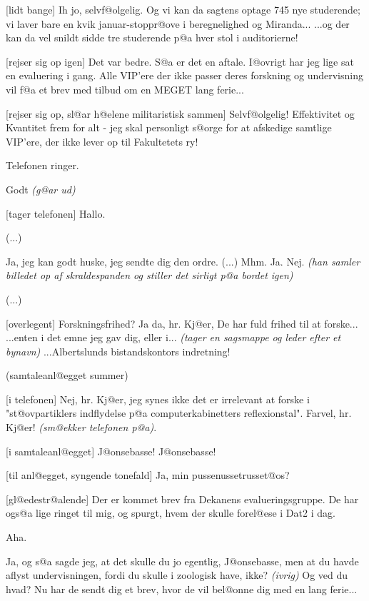 \documentclass[a4paper,11pt]{article}
\begin{document}
\begin{sketch}
[lidt bange] Ih jo, selvf@olgelig. Og vi kan da
sagtens optage 745 nye studerende; vi laver bare en kvik
januar-stoppr@ove i beregnelighed og Miranda... ...og der kan da vel
snildt sidde tre studerende p@a hver stol i auditorierne!

[rejser sig op igen] Det var bedre. S@a er det en
aftale. I@ovrigt har jeg lige sat en evaluering i gang. Alle VIP'ere
der ikke passer deres forskning og undervisning vil f@a et brev med
tilbud om en MEGET lang ferie...

[rejser sig op, sl@ar h@elene militaristisk sammen]
Selvf@olgelig! Effektivitet og Kvantitet frem for alt - jeg skal
personligt s@orge for at afskedige samtlige VIP'ere, der ikke lever
op til Fakultetets ry!

\scene Telefonen ringer.

 Godt {\em (g@ar ud)}

[tager telefonen] Hallo.

(...)

 Ja, jeg kan godt huske, jeg sendte dig den ordre.
(...) Mhm. Ja. Nej. {\em (han samler billedet op af skraldespanden og
stiller det sirligt p@a bordet igen)}

(...)

[overlegent] Forskningsfrihed? Ja da, hr. Kj@er, De
har fuld frihed til at forske... ...enten i det emne jeg gav dig,
eller i... {\em (tager en sagsmappe og leder efter et bynavn)}
...Albertslunds bistandskontors indretning!

\scene (samtaleanl@egget summer)

[i telefonen] Nej, hr. Kj@er, jeg synes ikke det er
irrelevant at forske i "st@ovpartiklers indflydelse p@a
computerkabinetters reflexionstal". Farvel, hr. Kj@er! {\em (sm@ekker
telefonen p@a)}.

[i samtaleanl@egget] J@onsebasse! J@onsebasse!

[til anl@egget, syngende tonefald] Ja, min
pussenussetrusset@os?

[gl@edestr@alende] Der er kommet brev fra Dekanens
evalueringsgruppe. De har ogs@a lige ringet til mig, og spurgt, hvem
der skulle forel@ese i Dat2 i dag.

 Aha.

 Ja, og s@a sagde jeg, at det skulle du jo egentlig,
J@onsebasse, men at du havde aflyst undervisningen, fordi du skulle i
zoologisk have, ikke? {\em (ivrig)} Og ved du hvad? Nu har de sendt
dig et brev, hvor de vil bel@onne dig med en lang ferie...


\end{sketch}
\end{document}
